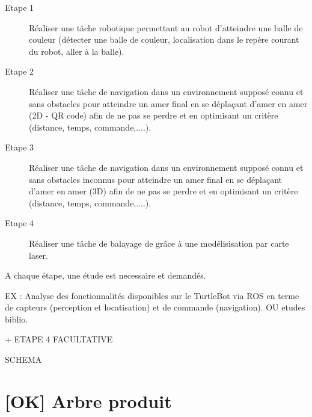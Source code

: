 \documentclass[10pt,a4paper]{article}
\begin{document}
\begin{description}

\item [Etape 1] Réaliser une tâche robotique permettant au robot d’atteindre une balle de couleur (détecter une balle de couleur, localisation dans le repère courant du robot, aller à la balle).

\item [Etape 2] Réaliser une tâche de navigation dans un environnement supposé connu et sans obstacles pour atteindre un amer final en se déplaçant d’amer en amer (2D - QR code) afin de ne pas se perdre et en optimisant un critère (distance, temps, commande,....).

\item [Etape 3] Réaliser une tâche de navigation dans un environnement supposé connu et sans obstacles inconnus pour atteindre un amer final en se déplaçant d’amer en amer (3D) afin de ne pas se perdre et en optimisant un critère (distance, temps, commande,....).

\item [Etape 4] Réaliser une tâche de balayage de grâce à une modélisisation par carte laser.

\end{description}

A chaque étape, une étude est necessaire et demandés. 

EX : Analyse des fonctionnalités disponibles sur le TurtleBot via ROS en terme de capteurs (perception et locatisation) et de commande (navigation). OU etudes biblio.

+ ETAPE 4 FACULTATIVE

SCHEMA

\section{[OK] Arbre produit}
\end{document}
